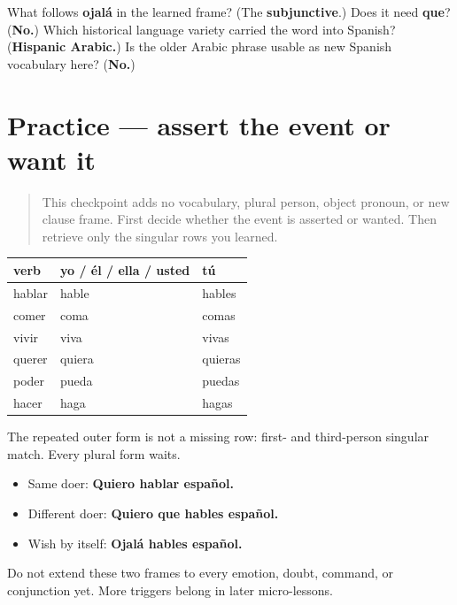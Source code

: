 \begin{tcolorbox}[breakable,colback=teal!4,colframe=teal!35!black,title={Before you move on}]
What follows \textbf{ojalá} in the learned frame? (The \textbf{subjunctive}.) Does it need \textbf{que}? (\textbf{No.}) Which historical language variety carried the word into Spanish? (\textbf{Hispanic Arabic.}) Is the older Arabic phrase usable as new Spanish vocabulary here? (\textbf{No.})
\end{tcolorbox}
\section[Practice]{Practice — assert the event or want it}

\label{lesson:ES-C18-practice}



\begin{quote}
This checkpoint adds no vocabulary, plural person, object pronoun, or new clause frame. First decide whether the event is asserted or wanted. Then retrieve only the singular rows you learned.
\end{quote}

\begin{grammarlens}[title={Grammar Lens: the bounded map}]
\noindent
\begin{tabularx}{\linewidth}{@{}>{\raggedright\arraybackslash}X>{\raggedright\arraybackslash}X>{\raggedright\arraybackslash}X@{}}
\toprule
\textbf{verb} & \textbf{yo / él / ella / usted} & \textbf{tú} \\
\midrule
hablar & hable & hables \\
comer & coma & comas \\
vivir & viva & vivas \\
querer & quiera & quieras \\
poder & pueda & puedas \\
hacer & haga & hagas \\
\bottomrule
\end{tabularx}

The repeated outer form is not a missing row: first- and third-person singular match. Every plural form waits.
\end{grammarlens}

\begin{grammarlens}[title={Grammar Lens: two safe triggers}]
\begin{itemize}
\raggedright
  \item Same doer: \textbf{Quiero hablar español.}
  \item Different doer: \textbf{Quiero que hables español.}
  \item Wish by itself: \textbf{Ojalá hables español.}
\end{itemize}

Do not extend these two frames to every emotion, doubt, command, or conjunction yet. More triggers belong in later micro-lessons.
\end{grammarlens}

